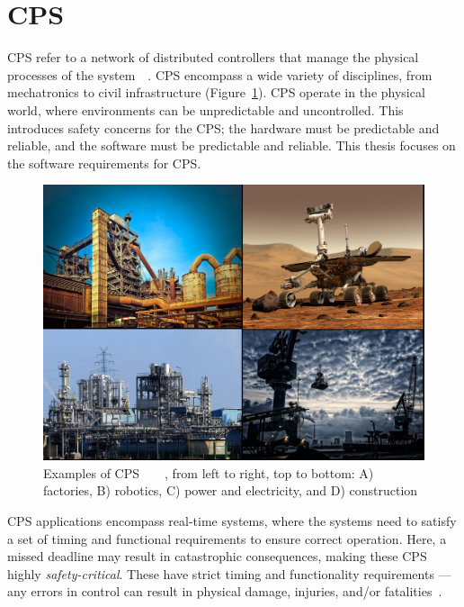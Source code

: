 \section{\acf{CPS}}
\acf{CPS} refer to a network of distributed controllers that manage the physical processes of the system~\cite{cps-design}~\cite{alur2015principles}. 
\ac{CPS} encompass a wide variety of disciplines, from mechatronics to civil infrastructure (Figure~\ref{fig:cps}).
\ac{CPS} operate in the physical world, where environments can be unpredictable and uncontrolled.
This introduces safety concerns for the \ac{CPS}; the hardware must be predictable and reliable, and the software must be predictable and reliable.
This thesis focuses on the software requirements for \ac{CPS}.

\begin{figure}[h]
	\centering
	\includegraphics[width=\textwidth]{Content/fig/1234.pdf}
	\caption{Examples of \ac{CPS}~\cite{industry-pic}~\cite{crane-pic}~\cite{rover-pic}~\cite{factory-pic}, from left to right, top to bottom: A) factories, B) robotics, C) power and electricity, and D) construction \label{fig:cps}}
\end{figure}

\ac{CPS} applications encompass real-time systems, where the systems need to satisfy a set of timing and functional requirements to ensure correct operation. 
Here, a missed deadline may result in catastrophic consequences, making these \ac{CPS} highly \textit{safety-critical}. 
These have strict timing and functionality requirements --- any errors in control can result in physical damage, injuries, and/or fatalities~\cite{ANNDevModel1999}. 


